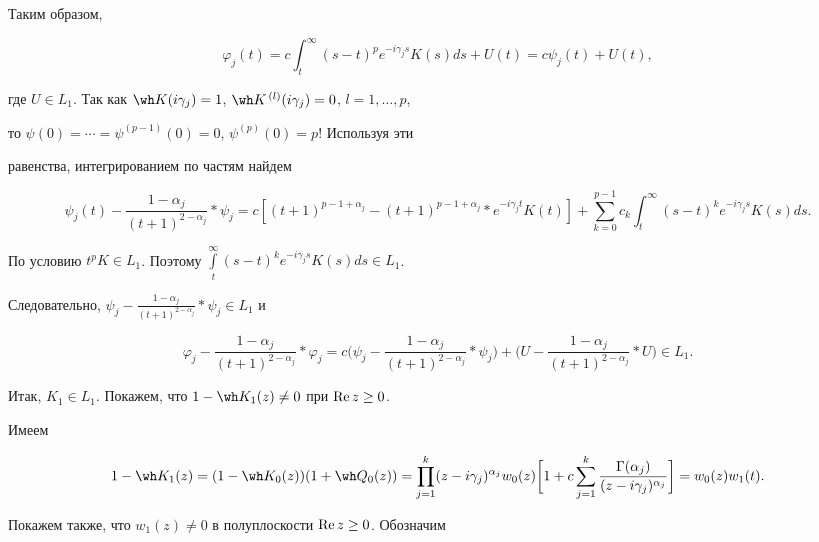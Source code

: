 \begin{pf}
Таким образом, 


$$ 


\varphi_j(t)=c\int^\infty_t(s-t)^p e^{-i\gamma_j s}K(s)ds+ 


U(t)=c\psi_j(t)+U(t), 


$$ 


где $U\in L_1$. Так как $\wh K(i\gamma_j)=1$, $\wh 


K^{\,(l)}(i\gamma_j)=0$, $l=1,\dotsc,p$, 


то $\psi(0)=\dotsb=\psi^{(p-1)}(0)=0$, $\psi^{(p)}(0)=p!$ Используя эти 


равенства, интегрированием по частям найдем 


$$ 


\psi_j(t)-\frac{1-\alpha_j}{(t+1)^{2-\alpha_j}}*\psi_j=c 


[(t+1)^{p-1+\alpha_j}-(t+1)^{p-1+\alpha_j} 


*e^{-i\gamma_j t}K(t)]+\sum^{p-1}_{k=0}c_k 


\int^\infty_t(s-t)^k e^{-i\gamma_j s}K(s)ds. 


$$ 


По условию $t^p K\in L_1$. Поэтому $\int\limits^\infty_t(s-t)^k 


e^{-i\gamma_j s}K(s)ds\in L_1$. 


Следовательно, $\psi_j-\frac{1-\alpha_j}{(t+1)^{2-\alpha_j}}*\psi_j\in 


L_1$ и 


$$ 


\varphi_j-\frac{1-\alpha_j}{(t+1)^{2-\alpha_j}}*\varphi_j= 


c\bigg(\psi_j-\frac{1-\alpha_j}{(t+1)^{2-\alpha_j}}*\psi_j\bigg)+ 


\bigg(U-\frac{1-\alpha_j}{(t+1)^{2-\alpha_j}}*U\bigg)\in L_1. 


$$ 


Итак, $K_1\in L_1$. Покажем, что $1-\wh K_1(z)\ne0$ при $\operatorname{Re} z\ge0$. 


Имеем 


$$ 


1-\wh K_1(z)=(1-\wh K_0(z))(1+\wh Q_0(z))= 


\prod^k_{j=1}(z-i\gamma_j)^{\alpha_j}w_0(z)\bigg[ 


1+c\sum^k_{j=1}\frac{\Gamma(\alpha_j)}{(z-i\gamma_j)^{\alpha_j}} 


\bigg]=w_0(z)w_1(t). 


$$ 


Покажем также, что $w_1(z)\ne0$ в полуплоскости $\operatorname{Re} z\ge0$. Обозначим 



\end{pf}

